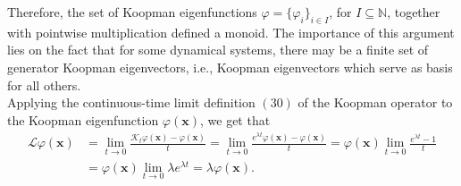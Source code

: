 \documentclass[]{article}
\begin{document}
Therefore, the set of Koopman eigenfunctions $\varphi = \{\varphi_i\}_{i \in I}$, for $I \subseteq \mathbb{N}$, together with pointwise multiplication defined a monoid. The importance of this argument lies on the fact that for some dynamical systems, there may be a finite set of generator Koopman eigenvectors, i.e., Koopman eigenvectors which serve as basis for all others. \\
Applying the continuous-time limit definition $(30)$ of the Koopman operator to the Koopman eigenfunction $\varphi(\textbf{x})$, we get that
\begin{equation}
	\begin{split}
		\mathcal{L}\varphi(\textbf{x}) & = \lim_{t \to 0} \frac{\mathcal{K}_t \varphi(\textbf{x}) - \varphi(\textbf{x})}{t} = \lim_{t \to 0} \frac{e^{\lambda t}\varphi(\textbf{x}) - \varphi(\textbf{x})}{t} = \varphi(\textbf{x}) \lim_{t \to 0} \frac{e^{\lambda t}-1}{t} \\ & = \varphi(\textbf{x})\lim_{t \to 0} \lambda e^{\lambda t} = \lambda \varphi(\textbf{x}).
	\end{split}
\end{equation}
\end{document}
